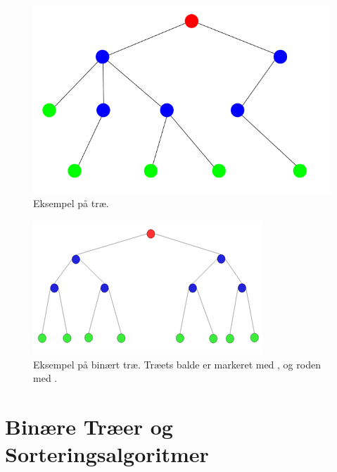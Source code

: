 \begin{figure}
	\begin{center}
		\includegraphics[scale=0.35]{../img/tree.png}
	\end{center}
	\caption{Eksempel på træ.}
	\label{fig:Eksempel på træ.}
\end{figure}



\begin{figure}
	\begin{center}
		\includegraphics[scale=1]{../img/binary_tree.png}
	\end{center}
	\caption{Eksempel på binært træ. Træets balde er markeret med , og roden med . \cite{binaert-trae}}
	\label{fig:Eksempel på binært træ}
\end{figure} 



\section{Binære Træer og Sorteringsalgoritmer}
\label{sec:Binære Træer og Sorteringsalgoritmer}
\cite[s. 109]{aogd}\\

